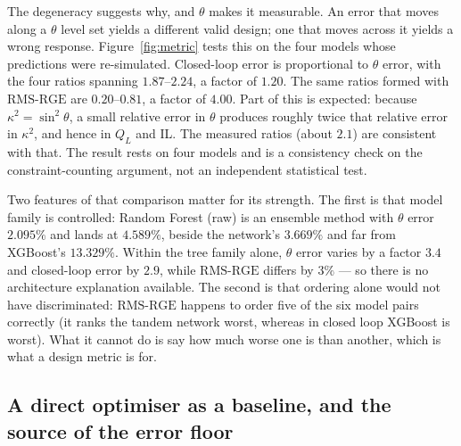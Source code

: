 \documentclass[11pt]{article}
\newcommand{\QL}{Q_L}
\newcommand{\rge}{\mathrm{RMS\text{-}RGE}}
\begin{document}
The degeneracy suggests why, and $\theta$ makes it measurable. An error that
moves along a $\theta$ level set yields a different valid design; one that
moves across it yields a wrong response. Figure~\ref{fig:metric} tests this
on the four models whose predictions were re-simulated. Closed-loop error is
proportional to $\theta$ error, with the four ratios spanning
$1.87$--$2.24$, a factor of $1.20$. The same ratios formed with $\rge$ are
$0.20$--$0.81$, a factor of $4.00$. Part of this is expected: because $\kappa^2 = \sin^2\theta$, a small relative error in $\theta$ produces roughly twice that relative error in $\kappa^2$, and hence in $\QL$ and IL. The measured ratios (about $2.1$) are consistent with that. The result rests on four models and is a consistency check on the constraint-counting argument, not an independent statistical test.

Two features of that comparison matter for its strength. The first is that
model family is controlled: Random Forest (raw) is an ensemble method with
$\theta$ error $2.095\%$ and lands at $4.589\%$, beside the network's
$3.669\%$ and far from XGBoost's $13.329\%$. Within the tree family alone,
$\theta$ error varies by a factor $3.4$ and closed-loop error by $2.9$, while
$\rge$ differs by $3\%$ --- so there is no architecture explanation available.
The second is that ordering alone would not have discriminated: $\rge$ happens to order five of the six model pairs correctly (it ranks the tandem network worst, whereas in closed loop XGBoost is worst). What it cannot do is say how
much worse one is than another, which is what a design metric is for.

\subsection{A direct optimiser as a baseline, and the source of the error floor}
\label{sec:baseline}
\end{document}
